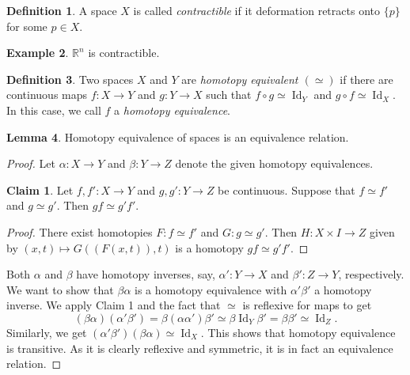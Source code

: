\documentclass[10pt,letterpaper,cm]{nupset}
\theoremstyle{definition}
\newtheorem{definition}{Definition}[subsection]
\newtheorem{exmp}[definition]{Example}
\theoremstyle{theorem}
\newtheorem{lemma}[definition]{Lemma}
\newtheorem*{claim}{Claim}
\theoremstyle{remark}
\newcommand{\R}{\mathbb R}
\newcommand{\1}{\mathbf{1}}
\newcommand{\0}{\vec 0}
\DeclareMathOperator{\id}{Id}
\begin{document}
\begin{definition}
A space $X$ is called \textit{contractible} if it deformation retracts onto $\{p\}$ for some $p\in X$.
\end{definition}

\begin{exmp}
$\R^n$ is contractible.
\end{exmp}

\begin{definition}
Two spaces $X$ and $Y$ are \textit{homotopy equivalent $(\simeq)$} if there are continuous maps $f: X\to Y$ and $g: Y \to X$ such that $f\circ g \simeq \id_Y$ and $g\circ f \simeq \id_X$. In this case, we call $f$ a \textit{homotopy equivalence}.
\end{definition}

\begin{lemma}
Homotopy equivalence of spaces is an equivalence relation.
\end{lemma}
\begin{proof}
Let $\alpha : X \to Y$ and $\beta: Y \to Z$ denote the given homotopy equivalences. 
\begin{claim}
Let $f, f': X \to Y$ and $g,g' : Y \to Z$ be continuous. Suppose that $f\simeq f'$ and $g \simeq g'$. Then $gf \simeq g'f'$.
\end{claim}
\begin{proof}
There exist homotopies $F: f \simeq f'$ and $G: g \simeq g'$. Then $H: X \times I \to Z$ given by $(x,t) \mapsto G((F(x, t)), t)$ is a homotopy $gf \simeq g'f'$.
\end{proof}
Both $\alpha$ and $\beta$ have homotopy inverses, say, $\alpha': Y \to X$ and $\beta': Z \to Y$, respectively.  We want to show that $\beta \alpha$ is a homotopy equivalence with  $\alpha ' \beta'$ a homotopy inverse. We apply Claim 1 and the fact that $\simeq$ is reflexive for maps to get $$(\beta \alpha)(\alpha' \beta') = \beta (\alpha \alpha ') \beta ' \simeq \beta \id_Y  \beta ' = \beta \beta' \simeq \id_Z  .$$ Similarly, we get $(\alpha' \beta')(\beta \alpha) \simeq \id_X$. This shows that homotopy equivalence is transitive. As it is clearly reflexive and symmetric, it is in fact an equivalence relation. 
\end{proof}
\end{document}

